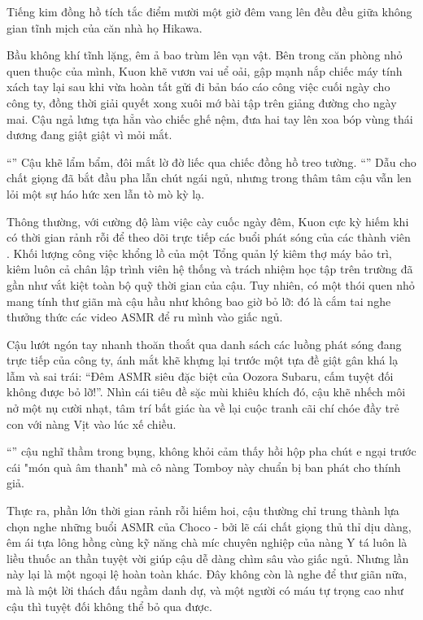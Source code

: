 \documentclass[../main.tex]{subfiles}
\begin{document}
Tiếng kim đồng hồ tích tắc điểm mười một giờ đêm vang lên đều đều giữa không gian tĩnh mịch của căn nhà họ Hikawa.

Bầu không khí tĩnh lặng, êm ả bao trùm lên vạn vật. Bên trong căn phòng nhỏ quen thuộc của mình, Kuon khẽ vươn vai uể oải, gập mạnh nắp chiếc máy tính xách tay lại sau khi vừa hoàn tất gửi đi bản báo cáo công việc cuối ngày cho công ty, đồng thời giải quyết xong xuôi mớ bài tập trên giảng đường cho ngày mai. Cậu ngả lưng tựa hẳn vào chiếc ghế nệm, đưa hai tay lên xoa bóp vùng thái dương đang giật giật vì mỏi mắt.

``'' Cậu khẽ lẩm bẩm, đôi mắt lờ đờ liếc qua chiếc đồng hồ treo tường. ``'' Dẫu cho chất giọng đã bắt đầu pha lẫn chút ngái ngủ, nhưng trong thâm tâm cậu vẫn len lỏi một sự háo hức xen lẫn tò mò kỳ lạ.

Thông thường, với cường độ làm việc cày cuốc ngày đêm, Kuon cực kỳ hiếm khi có thời gian rảnh rỗi để theo dõi trực tiếp các buổi phát sóng của các thành viên \hll. Khối lượng công việc khổng lồ của một Tổng quản lý kiêm thợ máy bảo trì, kiêm luôn cả chân lập trình viên hệ thống và trách nhiệm học tập trên trường đã gần như vắt kiệt toàn bộ quỹ thời gian của cậu. Tuy nhiên, có một thói quen nhỏ mang tính thư giãn mà cậu hầu như không bao giờ bỏ lỡ: đó là cắm tai nghe thưởng thức các video ASMR để ru mình vào giấc ngủ.

Cậu lướt ngón tay nhanh thoăn thoắt qua danh sách các luồng phát sóng đang trực tiếp của công ty, ánh mắt khẽ khựng lại trước một tựa đề giật gân khá lạ lẫm và sai trái: ``Đêm ASMR siêu đặc biệt của Oozora Subaru, cấm tuyệt đối không được bỏ lỡ!''. Nhìn cái tiêu đề sặc mùi khiêu khích đó, cậu khẽ nhếch môi nở một nụ cười nhạt, tâm trí bất giác ùa về lại cuộc tranh cãi chí chóe đầy trẻ con với nàng Vịt vào lúc xế chiều.

``'' cậu nghĩ thầm trong bụng, không khỏi cảm thấy hồi hộp pha chút e ngại trước cái "món quà âm thanh" mà cô nàng Tomboy này chuẩn bị ban phát cho thính giả.

Thực ra, phần lớn thời gian rảnh rỗi hiếm hoi, cậu thường chỉ trung thành lựa chọn nghe những buổi ASMR của Choco - bởi lẽ cái chất giọng thủ thỉ dịu dàng, êm ái tựa lông hồng cùng kỹ năng chà míc chuyên nghiệp của nàng Y tá luôn là liều thuốc an thần tuyệt vời giúp cậu dễ dàng chìm sâu vào giấc ngủ. Nhưng lần này lại là một ngoại lệ hoàn toàn khác. Đây không còn là nghe để thư giãn nữa, mà là một lời thách đấu ngầm danh dự, và một người có máu tự trọng cao như cậu thì tuyệt đối không thể bỏ qua được.
\end{document}

